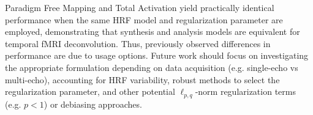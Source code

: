 Paradigm Free Mapping and Total Activation yield practically identical performance when the same HRF model and regularization parameter are employed, demonstrating that synthesis and analysis models are equivalent for temporal fMRI deconvolution. Thus, previously observed differences in performance are due to usage options. Future work should focus on investigating the appropriate formulation depending on data acquisition (e.g. single-echo vs multi-echo), accounting for HRF variability, robust methods to select the regularization parameter, and other potential \(\ell_{p,q}\)-norm regularization terms (e.g. \(p < 1\)) or debiasing approaches.